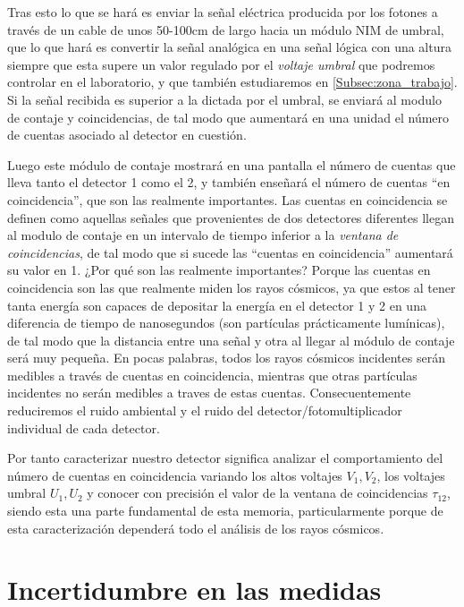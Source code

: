 \documentclass[11pt]{article}
\begin{document}
Tras esto lo que se hará es enviar la señal eléctrica producida por los fotones a través de un cable de unos 50-100cm de largo hacia un módulo NIM de umbral, que lo que hará es convertir la señal analógica en una señal lógica con una altura siempre que esta supere un valor regulado por el \textit{voltaje umbral} que podremos controlar en el laboratorio, y que también estudiaremos en \ref{Subsec:zona_trabajo}. Si la señal recibida es superior a la dictada por el umbral, se enviará al modulo de contaje y coincidencias, de tal modo que aumentará en una unidad el número de cuentas asociado al detector en cuestión.

Luego este módulo de contaje mostrará en una pantalla el número de cuentas que lleva tanto el detector 1 como el 2, y también enseñará el número de cuentas ``en coincidencia'', que son las realmente importantes. Las cuentas en coincidencia se definen como aquellas señales que provenientes de dos detectores diferentes llegan al modulo de contaje en un intervalo de tiempo inferior a la \textit{ventana de coincidencias}, de tal modo que si sucede las ``cuentas en coincidencia'' aumentará su valor en 1. ¿Por qué son las realmente importantes? Porque las cuentas en coincidencia son las que realmente miden los rayos cósmicos, ya que estos al tener tanta energía son capaces de depositar la energía en el detector 1 y 2 en una diferencia de tiempo de nanosegundos (son partículas  prácticamente lumínicas), de tal modo que la distancia entre una señal y otra al llegar al módulo de contaje será muy pequeña. En pocas palabras, todos los rayos cósmicos incidentes serán medibles a través de cuentas en coincidencia, mientras que otras partículas incidentes no serán medibles a traves de estas cuentas. Consecuentemente reduciremos el ruido ambiental y el ruido del detector/fotomultiplicador individual de cada detector.

Por tanto caracterizar nuestro detector significa analizar el comportamiento del número de cuentas en coincidencia variando los altos voltajes $V_1,V_2$, los voltajes umbral $U_1,U_2$ y conocer con precisión el valor de la ventana de coincidencias $\tau_{12}$, siendo esta una parte fundamental de esta memoria, particularmente porque de esta caracterización dependerá todo el análisis de los rayos cósmicos.


\section{Incertidumbre en las medidas}
\end{document}
